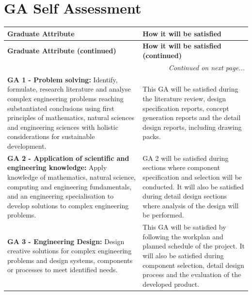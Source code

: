 \chapter{GA Self Assessment}


\begin{longtable}{|p{}|p{}|}



\hline
\textbf{Graduate Attribute} & \textbf{How it will be satisfied} \\
\hline
\endfirsthead

\hline
\textbf{Graduate Attribute (continued)} & \textbf{How it will be satisfied (continued)} \\
\hline
\endhead

\hline
\multicolumn{2}{r|}{\textit{Continued on next page...}} \\
\hline
\endfoot

\endlastfoot

\textbf{GA 1 - Problem solving:} Identify, formulate, research literature and analyse complex engineering problems reaching substantiated conclusions using first principles of mathematics, natural sciences and engineering sciences with holistic considerations for sustainable development. 
& 
This GA will be satisfied during the literature review, design specification reports, concept generation reports and the detail design reports, including drawing packs. \\
\hline

\textbf{GA 2 - Application of scientific and engineering knowledge:} 
Apply knowledge of mathematics, natural science, computing and engineering fundamentals, and an engineering specialisation to develop solutions to complex engineering problems. 
& 
GA 2 will be satisfied during sections where component specification and selection will be conducted. It will also be satisfied during detail design sections where analysis of the design will be performed. \\
\hline

\textbf{GA 3 - Engineering Design:} Design creative solutions for complex engineering problems and design systems, components or processes to meet identified needs.
& 
This GA will be satisfied by following the workplan and planned schedule of the project. It will also be satisfied during component selection, detail design process and the evaluation of the developed product. \\
\hline


\end{longtable}
